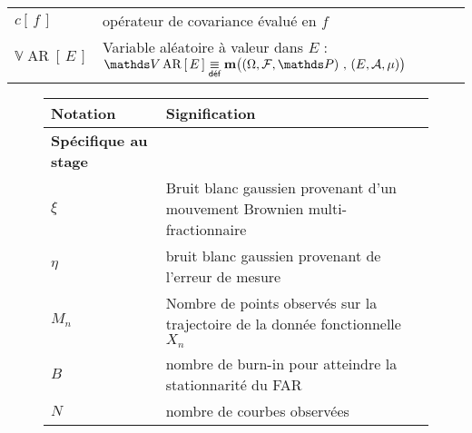 \begin{tabularx}{\textwidth}{lX}
	$c\left[ \, f \, \right]$                                        & opérateur de covariance évalué en $f$                                                                                                                                                                      \\
	$\mathds V \operatorname{AR}\left[ \, E \,\right]$               & Variable aléatoire à valeur dans $E$ : $\mathds V \operatorname{AR}\left[ \, E \,\right] \isdef \mathbf m\bigl( \left(\Omega, \mathcal F, \mathds P\right) \, , \, \left(E, \mathcal A, \mu\right) \bigr)$ \\
	\bottomrule
\end{tabularx}


\begin{figure}[H]
	\begin{tabularx}{\textwidth}{lX}
		\toprule
		\textbf{Notation} & \textbf{Signification}                                                                                                                                                                          \\
		\midrule
		\textbf{Spécifique au stage}                                                                                                                                                                                        \\
		\midrule
		$\xi$             & Bruit blanc gaussien provenant d'un mouvement Brownien multi-fractionnaire                                                                                                                      \\
		$\eta$            & bruit blanc gaussien provenant de l'erreur de mesure                                                                                                                                            \\
		\midrule
		$M_n$             & Nombre de points observés sur la trajectoire de la donnée fonctionnelle $X_n$                                                                                                                   \\
		$B$               & nombre de burn-in pour atteindre la stationnarité du FAR                                                                                                                                        \\
		$N$               & nombre de courbes observées                                                                                                                                                                     \\

\end{tabularx}
\end{figure}
